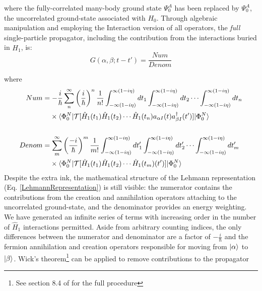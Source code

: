 \noindent
where the fully-correlated many-body ground state $\Psi^{A}_{0}$ has been replaced by
$\Psi^{A}_{0}$, the uncorrelated ground-state associated with $H_{0}$. Through algebraic
manipulation and employing the Interaction version of all operators,
the \textit{full} single-particle propagator, including the
contribution from the interactions buried in $\hat{H_{1}}$, is:
\begin{equation} \label{FullSPPropagator}
    G(\alpha, \beta; t-t') = \frac{Num}{Denom}
\end{equation}

\noindent
where
\begin{equation*}
    \begin{split}
        Num & = -\frac{i}{\hbar}\sum^{\infty}_{n}\left(\frac{i}{\hbar}\right)^{n}\frac{1}{n!}
    \int_{-\infty(1-i\eta)}^{\infty(1-i\eta)} dt_{1}
    \int_{-\infty(1-i\eta)}^{\infty(1-i\eta)} dt_{2} \cdots
    \int_{-\infty(1-i\eta)}^{\infty(1-i\eta)} dt_{n}\\
    & \phantom{ {}= } \times \braket{\Phi^{N}_{0}|\mathcal{T}[\hat{H}_{1}(t_{1})
    \hat{H}_{1}(t_{2}) \cdots \hat{H}_{1}(t_{n})a_{\alpha I}(t)a^{\dagger}_{\beta
    I}(t')]|\Phi^{N}_{0}}\\\\
    Denom & = \sum^{\infty}_{m}\left(\frac{-i}{\hbar}\right)^{m}\frac{1}{m!}
        \int_{-\infty(1-i\eta)}^{\infty(1-i\eta)} dt'_{1}
        \int_{-\infty(1-i\eta)}^{\infty(1-i\eta)} dt'_{2} \cdots
        \int_{-\infty(1-i\eta)}^{\infty(1-i\eta)} dt'_{m}\\
        & \phantom{ {}= } \times \braket{\Phi^{N}_{0}|
        \mathcal{T}[\hat{H}_{1}(t_{1})
        \hat{H}_{1}(t_{2}) \cdots \hat{H}_{1}(t_{m})(t')]|\Phi^{N}_{0}}
    \end{split}
\end{equation*}
\noindent
Despite the extra ink, the mathematical structure of the Lehmann
representation (Eq. \ref{LehmannRepresentation}) is still visible: the numerator contains
the contributions from the creation and annihilation operators attaching to the uncorrelated
ground-state, and the denominator provides an energy weighting. We have generated an infinite
series of terms with increasing order in the number of $\hat{H}_{1}$ interactions permitted.
Aside from arbitrary counting indices,
the only differences between the numerator and denominator are a
factor of $-\frac{i}{\hbar}$ and the fermion annihilation and creation operators
responsible for moving from $\ket{\alpha}$ to $\ket{\beta}$. Wick's
theorem\footnote{See section 8.4 of \cite{MBTE}
for the full procedure} can be applied to remove contributions to the propagator
